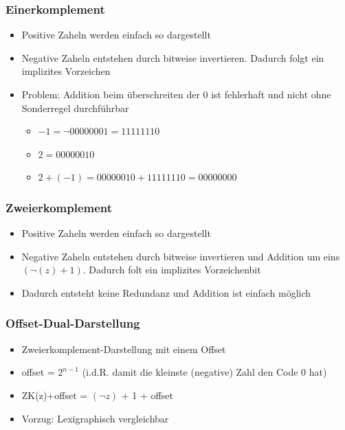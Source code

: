 \documentclass{kit}
\begin{document}
    \subsubsection{Einerkomplement}
      \begin{itemize}
        \item Positive Zaheln werden einfach so dargestellt
        \item Negative Zaheln entstehen durch bitweise invertieren. Dadurch folgt ein implizites 
          Vorzeichen
        \item Problem: Addition beim überschreiten der 0 ist fehlerhaft und nicht ohne Sonderregel
          durchführbar
          \begin{itemize}
            \item $-1=\lnot00000001=11111110$
            \item $2=00000010$
            \item $2+(-1)=00000010+11111110=00000000$
          \end{itemize}
      \end{itemize}
    \subsubsection{Zweierkomplement}
      \begin{itemize}
        \item Positive Zaheln werden einfach so dargestellt
        \item Negative Zaheln entstehen durch bitweise invertieren und Addition um eins 
          $(\lnot(z)+1)$. Dadurch folt ein implizites Vorzeichenbit
        \item Dadurch entsteht keine Redundanz und Addition ist einfach möglich
      \end{itemize}
    \subsubsection{Offset-Dual-Darstellung}
      \begin{itemize}
        \item Zweierkomplement-Darstellung mit einem Offset
        \item offset = $2^{n-1}$ (i.d.R. damit die kleinste (negative) Zahl den Code 0 hat)
        \item ZK(z)+offset = $(\lnot z)$ + 1 + offset
        \item Vorzug: Lexigraphisch vergleichbar
      \end{itemize}
\end{document}
